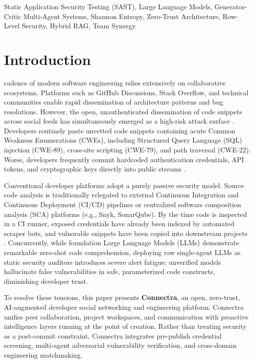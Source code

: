 \documentclass[journal,10pt,twocolumn]{IEEEtran}
\begin{document}
\begin{IEEEkeywords}
Static Application Security Testing (SAST), Large Language Models, Generator-Critic Multi-Agent Systems, Shannon Entropy, Zero-Trust Architecture, Row-Level Security, Hybrid RAG, Team Synergy.
\end{IEEEkeywords}

\section{Introduction}
 cadence of modern software engineering relies extensively on collaborative ecosystems. Platforms such as GitHub Discussions, Stack Overflow, and technical communities enable rapid dissemination of architecture patterns and bug resolutions. However, the open, unauthenticated dissemination of code snippets across social feeds has simultaneously emerged as a high-risk attack surface \cite{pearce2022asleep, sandoval2023lost}. Developers routinely paste unvetted code snippets containing acute Common Weakness Enumerations (CWEs), including Structured Query Language (SQL) injection (CWE-89), cross-site scripting (CWE-79), and path traversal (CWE-22). Worse, developers frequently commit hardcoded authentication credentials, API tokens, and cryptographic keys directly into public streams \cite{meli2019how}.

Conventional developer platforms adopt a purely passive security model. Source code analysis is traditionally relegated to external Continuous Integration and Continuous Deployment (CI/CD) pipelines or centralized software composition analysis (SCA) platforms (e.g., Snyk, SonarQube). By the time code is inspected in a CI runner, exposed credentials have already been indexed by automated scraper bots, and vulnerable snippets have been copied into downstream projects \cite{meli2019how}. Concurrently, while foundation Large Language Models (LLMs) demonstrate remarkable zero-shot code comprehension, deploying raw single-agent LLMs as static security auditors introduces severe alert fatigue: unverified models hallucinate false vulnerabilities in safe, parameterized code constructs, diminishing developer trust.

To resolve these tensions, this paper presents \textbf{Connectra}, an open, zero-trust, AI-augmented developer social networking and engineering platform. Connectra unifies peer collaboration, project workspaces, and communication with proactive intelligence layers running at the point of creation. Rather than treating security as a post-commit constraint, Connectra integrates pre-publish credential screening, multi-agent adversarial vulnerability verification, and cross-domain engineering matchmaking.
\end{document}
